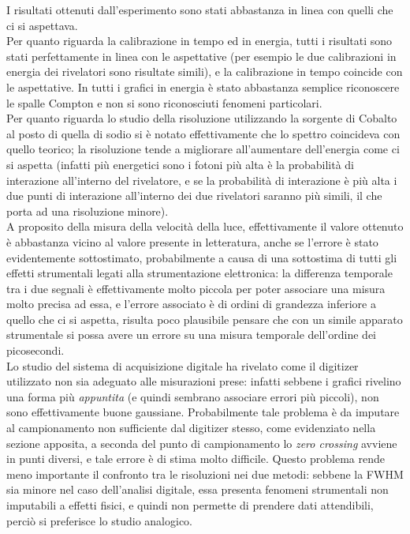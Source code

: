 I risultati ottenuti dall'esperimento sono stati abbastanza in linea con quelli che ci si aspettava.\\

Per quanto riguarda la calibrazione in tempo ed in energia, tutti i risultati sono stati perfettamente in linea con le aspettative (per esempio le due calibrazioni in energia
dei rivelatori sono risultate simili), e la calibrazione in tempo coincide con le aspettative. In tutti i grafici in energia è stato abbastanza semplice riconoscere le spalle
Compton e non si sono riconosciuti fenomeni particolari.\\

Per quanto riguarda lo studio della risoluzione utilizzando la sorgente di Cobalto al posto di quella di sodio si è notato effettivamente che lo spettro coincideva con
quello teorico; la risoluzione tende a migliorare all'aumentare dell'energia come ci si aspetta (infatti più energetici sono i fotoni più alta è la probabilità di interazione
all'interno del rivelatore, e se la probabilità di interazione è più alta i due punti di interazione all'interno dei due rivelatori saranno più simili, il che porta
ad una risoluzione minore).\\

A proposito della misura della velocità della luce, effettivamente il valore ottenuto è abbastanza vicino al valore presente in letteratura, anche se l'errore è stato
evidentemente sottostimato, probabilmente a causa di una sottostima di tutti gli effetti strumentali legati alla strumentazione elettronica: la differenza temporale
tra i due segnali è effettivamente molto piccola per poter associare una misura molto precisa ad essa, e l'errore associato è di ordini di grandezza inferiore a quello che
ci si aspetta, risulta poco plausibile pensare che con un simile apparato strumentale si possa avere un errore su una misura temporale dell'ordine dei picosecondi.\\

Lo studio del sistema di acquisizione digitale ha rivelato come il digitizer utilizzato non sia adeguato alle misurazioni prese: infatti sebbene i grafici rivelino una
forma più \textit{appuntita} (e quindi sembrano associare errori più piccoli), non sono effettivamente buone gaussiane. Probabilmente tale problema è da imputare al
campionamento non sufficiente dal digitizer stesso, come evidenziato nella sezione apposita, a seconda del punto di campionamento lo \textit{zero crossing} avviene in
punti diversi, e tale errore è di stima molto difficile. Questo problema rende meno importante il confronto tra le risoluzioni nei due metodi: sebbene la FWHM sia minore
nel caso dell'analisi digitale, essa presenta fenomeni strumentali non imputabili a effetti fisici, e quindi non permette di prendere dati attendibili, perciò si preferisce
lo studio analogico.
